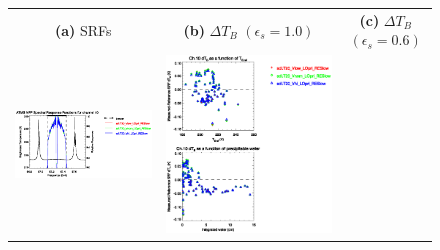 \begin{figure}[H]
  \centering
  \begin{tabular}{c c c}
    \textsf{\textbf{(a)} SRFs} &
    \textsf{\textbf{(b)} $\Delta T_B$ $(\epsilon_s = 1.0)$} &
    \textsf{\textbf{(c)} $\Delta T_B$ $(\epsilon_s = 0.6)$} \\
    \includegraphics[bb=80 400 280 558,clip,scale=0.85]{graphics/srf/Vset/atms_npp.ch10.osrf.eps} &
    \includegraphics[bb=85 400 260 558,clip,scale=0.85]{graphics/dtb/Vset/e1.0_r0.0/atms_npp.ch10.dTb.eps} & 

\end{tabular}
\end{figure}
